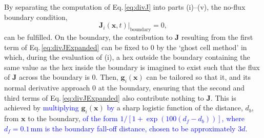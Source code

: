 \documentclass[9pt,lineno]{elife}
\newcommand{\cmnt}[1]{\textcolor{blue}{#1}}
\newcommand{\mb}[1]{\mathbf{#1}}
\begin{document}
By separating the computation of Eq.\,\ref{eq:divJ} into parts (i)--(v), the
no-flux boundary condition,
%
\begin{equation}
  \label{eq:noflux}
  \mb{J}_i(\mb{x},t)\big\rvert_{\mathrm{boundary}} = 0,
\end{equation}
%
can be fulfilled. On
the boundary, the contribution to $\mb{J}$ resulting from the first term of
Eq.\,\ref{eq:divJExpanded} can be fixed to 0 by the `ghost cell method' in
which, during the evaluation of (i), a hex outside the boundary containing the
same value as the hex inside the boundary is imagined to exist such that the
flux of $\mb{J}$ across the boundary is 0. Then, $\mb{g}_i(\mb{x})$ can be
tailored so that it, and its normal derivative approach 0 at the boundary,
ensuring that the second and third terms of Eq.\,\ref{eq:divJExpanded} also
contribute nothing to $\mb{J}$. This is achieved by \cmnt{multiplying}
$\mb{g}_i(\mb{x})$ \cmnt{by} a sharp logistic function of the distance, $d_b$,
from $\mb{x}$ to the boundary, \cmnt{of the form $1/[1 +
  \exp(100(d_f-d_b))]$, where $d_f=0.1$\,mm is the boundary fall-off distance,
  chosen to be approximately $3d$}.
\end{document}
